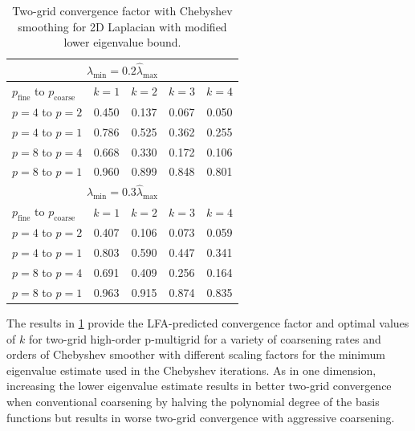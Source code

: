 \documentclass[review]{siamart190516}
\begin{document}
\begin{table}[ht!]
\begin{center}
\begin{tabular}{l c c c c}
  \toprule
  \multicolumn{5}{c}{$\lambda_{\min} = 0.2 \hat{\lambda}_{\max}$} \\
  \toprule
  $p_{\text{fine}}$ to $p_{\text{coarse}}$  &  $k = 1$   &  $k = 2$   &  $k = 3$   &  $k = 4$   \\
  \toprule
  $p = 4$ to $p = 2$   &  0.450  &  0.137  &  0.067  &  0.050  \\
  $p = 4$ to $p = 1$   &  0.786  &  0.525  &  0.362  &  0.255  \\
  \midrule
  $p = 8$ to $p = 4$   &  0.668  &  0.330  &  0.172  &  0.106  \\
  $p = 8$ to $p = 1$   &  0.960  &  0.899  &  0.848  &  0.801  \\
  \toprule
  \multicolumn{5}{c}{$\lambda_{\min} = 0.3 \hat{\lambda}_{\max}$} \\
  \toprule
  $p_{\text{fine}}$ to $p_{\text{coarse}}$  &  $k = 1$   &  $k = 2$   &  $k = 3$   &  $k = 4$   \\
  \toprule
  $p = 4$ to $p = 2$   &  0.407  &  0.106  &  0.073  &  0.059  \\
  $p = 4$ to $p = 1$   &  0.803  &  0.590  &  0.447  &  0.341  \\
  \midrule
  $p = 8$ to $p = 4$   &  0.691  &  0.409  &  0.256  &  0.164  \\
  $p = 8$ to $p = 1$   &  0.963  &  0.915  &  0.874  &  0.835  \\
  \bottomrule
\end{tabular}
\end{center}
\caption{Two-grid convergence factor with Chebyshev smoothing for 2D Laplacian with modified lower eigenvalue bound.}
\label{table:two_grid_2d_chebyshev_eigenvalues}
\end{table}

The results in \cref{table:two_grid_2d_chebyshev_eigenvalues} provide the LFA-predicted convergence factor and optimal values of $k$ for two-grid high-order p-multigrid for a variety of coarsening rates and orders of Chebyshev smoother with different scaling factors for the minimum eigenvalue estimate used in the Chebyshev iterations.
As in one dimension, increasing the lower eigenvalue estimate results in better two-grid convergence when conventional coarsening by halving the polynomial degree of the basis functions but results in worse two-grid convergence with aggressive coarsening.
\end{document}
